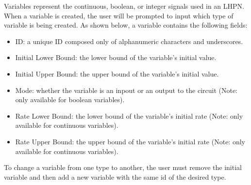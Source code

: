 \documentclass[titlepage,11pt]{article}
\begin{document}
\noindent
Variables represent the continuous, boolean, or integer signals used in an LHPN.
When a variable is created, the user will be prompted to input which type of
variable is being created.
As shown below, a variable contains the following fields:
\begin{itemize}
\item ID: a unique ID composed only of alphanumeric characters and 
       underscores.
\item Initial Lower Bound: the lower bound of the variable's initial value.
\item Initial Upper Bound: the upper bound of the variable's initial value.
\item Mode: whether the variable is an inpout or an output to the circuit
       (Note: only available for boolean variables).
\item Rate Lower Bound: the lower bound of the variable's initial rate 
       (Note: only available for continuous variables).
\item Rate Upper Bound: the upper bound of the variable's initial rate
       (Note: only available for continuous variables).
\end{itemize}
To change a variable from one type to another, the user must remove the initial
variable and then add a new variable with the same id of the desired type.
\end{document}
